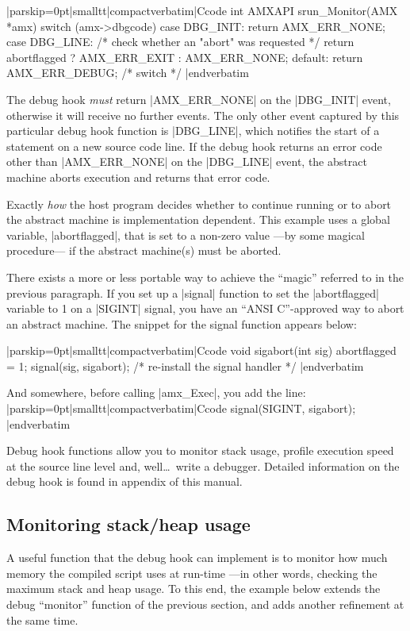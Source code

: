 \listingx\verbatim|parskip=0pt|smalltt|compactverbatim|Ccode
int AMXAPI srun_Monitor(AMX *amx)
{
  switch (amx->dbgcode) {
  case DBG_INIT:
    return AMX_ERR_NONE;
  case DBG_LINE:
    /* check whether an "abort" was requested */
    return abortflagged ? AMX_ERR_EXIT : AMX_ERR_NONE;
  default:
    return AMX_ERR_DEBUG;
  } /* switch */
}
|endverbatim\endlistingx

The debug hook {\it must\/} return |AMX_ERR_NONE| on the |DBG_INIT| event,
otherwise it will receive no further events. The only other event captured by
this particular debug hook function is |DBG_LINE|, which notifies the start
of a statement on a new source code line. If the debug hook returns an error
code other than |AMX_ERR_NONE| on the |DBG_LINE| event, the abstract machine
aborts execution and returns that error code.

Exactly {\it how\/} the host program decides whether to continue running or
to abort the abstract machine is implementation dependent. This example uses
a global variable, |abortflagged|, that is set to a non-zero value ---by some
magical procedure--- if the abstract machine(s) must be aborted.

There exists a more or less portable way to achieve the ``magic'' referred to
in the previous paragraph. If you set up a |signal| function to set the
|abortflagged| variable to 1 on a |SIGINT| signal, you have an ``ANSI C''-approved
way to abort an abstract machine. The snippet for the signal function appears
below:

\listingx\verbatim|parskip=0pt|smalltt|compactverbatim|Ccode
void sigabort(int sig)
{
  abortflagged = 1;
  signal(sig, sigabort);        /* re-install the signal handler */
}
|endverbatim\endlistingx

And somewhere, before calling |amx_Exec|, you add the line:
\listingx\verbatim|parskip=0pt|smalltt|compactverbatim|Ccode
signal(SIGINT, sigabort);
|endverbatim\endlistingx

Debug hook functions allow you to monitor stack usage, profile execution speed
at the source line level and, well\dots\ write a debugger. Detailed information
on the debug hook is found in appendix  of
this manual.%

\subsection{Monitoring stack/heap usage}
A useful function that the debug hook can implement is to monitor how much memory
the compiled script uses at run-time ---in other words, checking the maximum stack
and heap usage. To this end, the example below extends the debug ``monitor''
function of the previous section, and adds another refinement at the same time.

